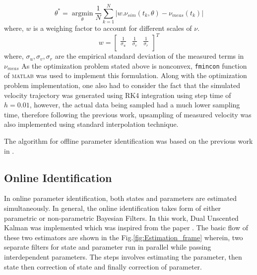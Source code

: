 \documentclass[12pt,titlepage]{article}
\begin{document}
\begin{equation}
\theta^* = \underset{\theta}{\operatorname{argmin}} \frac{1}{N}\sum_{k=1}^{N}|w.\nu_{sim}(t_k,\theta) - \nu_{meas}(t_k)|
\end{equation}
where, $w$ is a weighing factor to account for different scales of $\nu$. 
\begin{equation}
    w = 
    \begin{bmatrix}
        \frac{1}{\sigma_u} & \frac{1}{\sigma_v} & \frac{1}{\sigma_r} \\
    \end{bmatrix}^T
\end{equation}
where, $\sigma_u, \sigma_v, \sigma_r$ are the empirical standard deviation of the measured terms in $\nu_{meas}$
As the optimization problem stated above is nonconvex, \texttt{fmincon} function of \textsc{matlab} was used to implement this formulation. Along with the optimization problem implementation, one also had to consider the fact that the simulated velocity trajectory was generated using RK4 integration using step time of $h=0.01$, however, the actual data being sampled had a much lower sampling time, therefore following the previous work, upsampling of measured velocity was also implemented using standard interpolation technique. 

The algorithm for offline parameter identification was based on the previous work in \cite{b2}. 


\subsection{Online Identification}
In online parameter identification, both states and parameters are estimated simultaneously. In general, the online identification takes form of either parametric or non-parametric Bayesian Filters. In this work, Dual Unscented Kalman was implemented which was inspired from the paper \cite{b3}.  The basic flow of these two estimators are shown in the Fig.\ref{fig:Estimation_frame} wherein, two separate filters for state and parameter run in parallel while passing interdependent parameters. The steps involves estimating the parameter, then state then correction of state and finally correction of parameter. 
\end{document}

